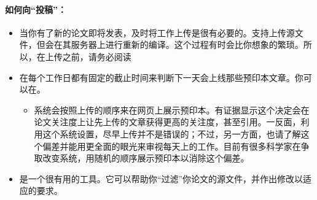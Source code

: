 \documentclass[letterpaper,10pt,english]{sphinxmanual}
\begin{document}
\paragraph{如何向“投稿”：}
\label{\detokenize{resource/research/getting_started_cn:id16}}\begin{itemize}
\item {} 
当你有了新的论文即将发表，及时将工作上传是很有必要的。支持上传源文件，但会在其服务器上进行重新的编译。这个过程有时会比你想象的繁琐。所以，在上传之前，请务必阅读

\item {} 
在每个工作日都有固定的截止时间来判断下一天会上线那些预印本文章。你可以在。
\begin{itemize}
\item {} 
系统会按照上传的顺序来在网页上展示预印本。有证据显示这个决定会在论文关注度上让先上传的文章获得更高的关注度，甚至引用。一反面，利用这个系统设置，尽早上传并不是错误的；不过，另一方面，也请了解这个偏差并能用更全面的眼光来审视每天上的工作。目前有很多科学家在争取改变系统，用随机的顺序展示预印本以消除这个偏差。

\end{itemize}

\item {} 
是一个很有用的工具。它可以帮助你“过滤”你论文的源文件，并作出修改以适应的要求。

\end{itemize}
\end{document}
